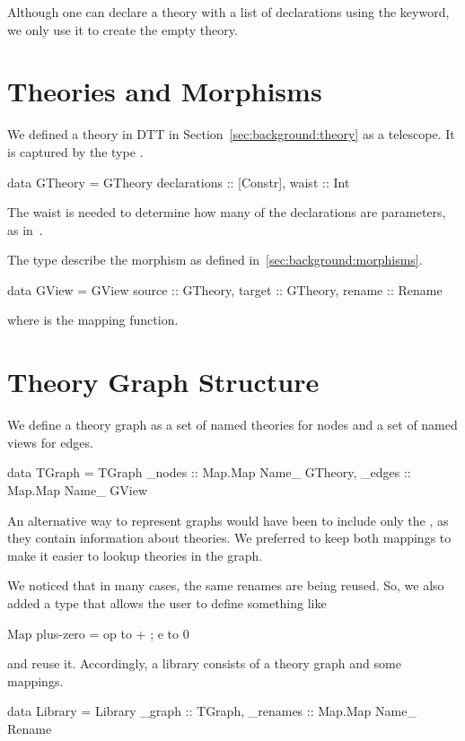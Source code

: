 Although one can declare a theory with a list of declarations using the  keyword, we only use it to create the empty theory. 


\section{Theories and Morphisms}
\label{subsec:theoriesMorphisms}
We defined a theory in DTT in Section~\ref{sec:background:theory} as a telescope.  It is captured by the type . 
\begin{hscode}
data GTheory = GTheory {
  declarations :: [Constr],
  waist        :: Int     }
\end{hscode}
The waist is needed to determine how many of the declarations are parameters, as in~\cite{alhassy2019}. 

The type  describe the morphism as defined in~\ref{sec:background:morphisms}. 
\begin{hscode}
data GView  = GView {
  source  :: GTheory,
  target  :: GTheory,
  rename :: Rename }  
\end{hscode}
\noindent where  is the mapping function. 

\section{Theory Graph Structure}
\label{subsec:graph}
We define a theory graph as a set of named theories for nodes and a set of named views for edges. 
\begin{hscode}
data TGraph = TGraph { 
  _nodes :: Map.Map Name_ GTheory,
  _edges :: Map.Map Name_ GView } 
\end{hscode}
An alternative way to represent graphs would have been to include only the , as they contain information about theories. We preferred to keep both mappings to make it easier to lookup theories in the graph. 

We noticed that in many cases, the same renames are being reused. So, we also added a  type that allows the user to define something like 
\begin{hscode}
Map plus-zero = {op to + ; e to 0}
\end{hscode}
\noindent and reuse it. Accordingly, a library consists of a theory graph and some mappings. 
\begin{hscode}
data Library = Library {
  _graph   :: TGraph,
  _renames :: Map.Map Name_ Rename }
\end{hscode}

